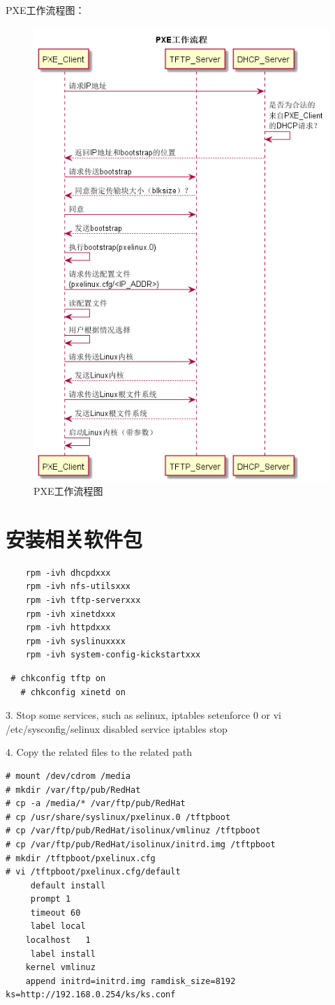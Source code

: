 PXE工作流程图：
\begin{figure}[htbp]
  \begin{center}
    \includegraphics[width=.55\textwidth]{graph/pxe01.png}
  \end{center}
  \caption{PXE工作流程图}
  \label{fig:pxeWorkFlow}
\end{figure}

\section{安装相关软件包}

\small{
\begin{verbatim}
	rpm -ivh dhcpdxxx
	rpm -ivh nfs-utilsxxx
	rpm -ivh tftp-serverxxx
	rpm -ivh xinetdxxx
	rpm -ivh httpdxxx
	rpm -ivh syslinuxxxx
	rpm -ivh system-config-kickstartxxx
\end{verbatim}
}
\normalsize

\small{
\begin{verbatim}
 # chkconfig tftp on
   # chkconfig xinetd on
\end{verbatim}
}
\normalsize
   
3. Stop some services, such as selinux, iptables
   setenforce 0
or  vi /etc/sysconfig/selinux disabled
    service iptables stop

4. Copy the related files to the related path

\small{
\begin{verbatim}
# mount /dev/cdrom /media
# mkdir /var/ftp/pub/RedHat
# cp -a /media/* /var/ftp/pub/RedHat
# cp /usr/share/syslinux/pxelinux.0 /tftpboot
# cp /var/ftp/pub/RedHat/isolinux/vmlinuz /tftpboot
# cp /var/ftp/pub/RedHat/isolinux/initrd.img /tftpboot
# mkdir /tftpboot/pxelinux.cfg
# vi /tftpboot/pxelinux.cfg/default 
     default install
     prompt 1
     timeout 60
     label local
	localhost	1
     label install
	kernel vmlinuz
	append initrd=initrd.img ramdisk_size=8192 ks=http://192.168.0.254/ks/ks.conf
\end{verbatim}
}
\normalsize

